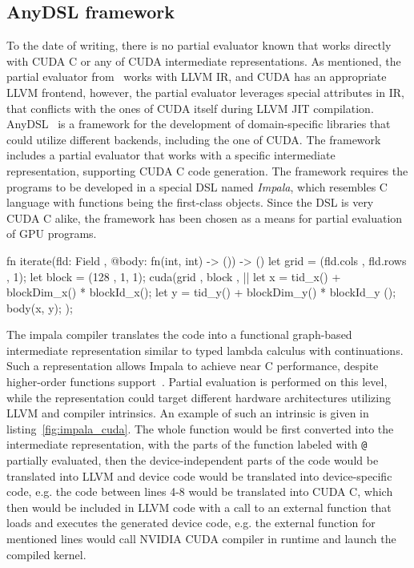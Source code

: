 \subsection{AnyDSL framework}
To the date of writing, there is no partial evaluator known that 
works directly with CUDA C or any of CUDA intermediate representations.
As mentioned, the partial evaluator from~\cite{LLVMmix} works with LLVM IR, and CUDA has 
an appropriate LLVM frontend, however, the partial evaluator leverages special 
attributes in IR, that conflicts with the ones of CUDA itself during LLVM JIT 
compilation.
AnyDSL~\cite{LeiBa} is a framework for the development of domain-specific 
libraries that could utilize different backends, including the one of CUDA.
The framework includes a partial evaluator that works with a specific intermediate 
representation, supporting CUDA C code generation.
The framework requires the programs to be developed in a special DSL named 
\emph{Impala}, which resembles C language with functions being the first-class 
objects.
Since the DSL is very CUDA C alike, the framework has been chosen as a means 
for partial evaluation of GPU programs.


\begin{listing}
    \begin{pyglist}[language=Rust, label = fig:impala_cuda, caption=Impala GPU-accelerated loop]
    fn iterate(fld: Field , @body: fn(int, int) -> ()) -> () {
        let grid = (fld.cols , fld.rows , 1);
        let block = (128 , 1, 1);
        cuda(grid , block , || {
            let x = tid_x() + blockDim_x() * blockId_x();
            let y = tid_y() + blockDim_y() * blockId_y ();
            body(x, y);
        });
    }
    \end{pyglist}
    \end{listing}

The impala compiler translates the code into a functional graph-based intermediate 
representation similar to typed lambda calculus with continuations. 
Such a representation allows Impala to achieve near C performance, 
despite higher-order functions support~\cite{Thorin}.
Partial evaluation is performed on this level, while the representation 
could target different hardware architectures utilizing LLVM and compiler 
intrinsics.
An example of such an intrinsic is given in listing~\ref{fig:impala_cuda}.
The whole function would be first converted into the intermediate representation, 
with the parts of the function labeled with \lstinline{@} 
partially evaluated, then the device-independent 
parts of the code would be translated into LLVM and device code 
would be translated into device-specific code, e.g. 
the code between lines 4-8 would be translated into CUDA C, 
which then would be included in LLVM code with a call to an external 
function that loads and executes the generated device code, 
e.g. the external function for mentioned lines would call NVIDIA CUDA 
compiler in runtime and launch the compiled kernel.



